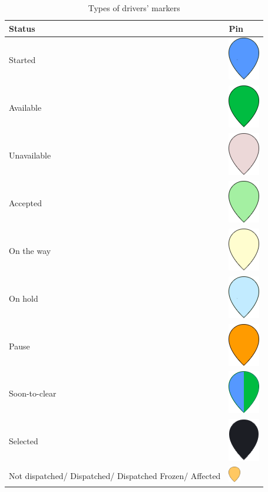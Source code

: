 \begin{table}[!htbp]
\begin{center}
\noindent\begin{tabular}{| m{33em} | m{2cm} | }
\hline
Status & Pin \\
\hline
Started & \includegraphics[width=0.2 in]{images/pins/started.png} \\ 
Available & \includegraphics[width=0.2 in]{images/pins/dispo.png}  \\ 
Unavailable & \includegraphics[width=0.2 in]{images/pins/indispo.png}  \\ 
Accepted & \includegraphics[width=0.2 in]{images/pins/accepted.png}  \\ 
On the way & \includegraphics[width=0.2 in]{images/pins/way_to.png}  \\ 
On hold & \includegraphics[width=0.2 in]{images/pins/wait.png} \\  
Pause  & \includegraphics[width=0.2 in]{images/pins/pause.png}  \\ 
Soon-to-clear & \includegraphics[width=0.2 in]{images/pins/soon-to-clear.png}  \\  
Selected &  \includegraphics[width=0.2 in]{images/pins/selected.png}   \\ 
Not dispatched/ Dispatched/ Dispatched Frozen/ Affected & \includegraphics[width=0.2in]{images/pins/not_dispatched-dispatched-dispatched_frozen-affected.png} \\ 
\hline
\end{tabular}
\end{center}
\label{pins}
\caption{Types of drivers' markers}
\end{table}




